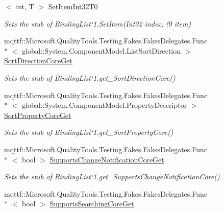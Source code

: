 \begin{DoxyCompactItemize}
$<$ int, T $>$ \hyperlink{class_system_1_1_component_model_1_1_fakes_1_1_stub_binding_list_3_01_t_01_4_a3fd14dc39475da869af97c375bc97af4}{Set\-Item\-Int32\-T0}
\begin{DoxyCompactList}\small\item\em Sets the stub of Binding\-List`1.Set\-Item(Int32 index, !0 item)\end{DoxyCompactList}\item 
mqttf\-::\-Microsoft.\-Quality\-Tools.\-Testing.\-Fakes.\-Fakes\-Delegates.\-Func\\*
$<$ global\-::\-System.\-Component\-Model.\-List\-Sort\-Direction $>$ \hyperlink{class_system_1_1_component_model_1_1_fakes_1_1_stub_binding_list_3_01_t_01_4_a2462e88a3454d837691a3a39c0a2f866}{Sort\-Direction\-Core\-Get}
\begin{DoxyCompactList}\small\item\em Sets the stub of Binding\-List`1.get\-\_\-\-Sort\-Direction\-Core()\end{DoxyCompactList}\item 
mqttf\-::\-Microsoft.\-Quality\-Tools.\-Testing.\-Fakes.\-Fakes\-Delegates.\-Func\\*
$<$ global\-::\-System.\-Component\-Model.\-Property\-Descriptor $>$ \hyperlink{class_system_1_1_component_model_1_1_fakes_1_1_stub_binding_list_3_01_t_01_4_ad627f65eae0221bfc8afe7846c93fa07}{Sort\-Property\-Core\-Get}
\begin{DoxyCompactList}\small\item\em Sets the stub of Binding\-List`1.get\-\_\-\-Sort\-Property\-Core()\end{DoxyCompactList}\item 
mqttf\-::\-Microsoft.\-Quality\-Tools.\-Testing.\-Fakes.\-Fakes\-Delegates.\-Func\\*
$<$ bool $>$ \hyperlink{class_system_1_1_component_model_1_1_fakes_1_1_stub_binding_list_3_01_t_01_4_a07abd52e76400fa1f004dbf69d69d18c}{Supports\-Change\-Notification\-Core\-Get}
\begin{DoxyCompactList}\small\item\em Sets the stub of Binding\-List`1.get\-\_\-\-Supports\-Change\-Notification\-Core()\end{DoxyCompactList}\item 
mqttf\-::\-Microsoft.\-Quality\-Tools.\-Testing.\-Fakes.\-Fakes\-Delegates.\-Func\\*
$<$ bool $>$ \hyperlink{class_system_1_1_component_model_1_1_fakes_1_1_stub_binding_list_3_01_t_01_4_a6e99b8983f31c609be1c9bfff221576a}{Supports\-Searching\-Core\-Get}

\end{DoxyCompactItemize}
